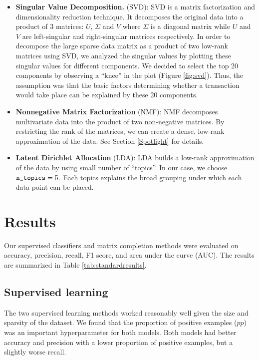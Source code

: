 \documentclass{article} %
\begin{document}
\begin{itemize}

    \item \textbf{Singular Value Decomposition.} (SVD): SVD is a matrix factorization and dimensionality reduction technique. It decomposes the original data into a product of 3 matrices: $U$, $\Sigma$ and $V$ where $\Sigma$ is a diagonal matrix while $U$ and $V$ are left-singular and right-singular matrices respectively. In order to decompose the large sparse data matrix as a product of two low-rank matrices using SVD, we analyzed the singular values by plotting these singular values for different components. We decided to select the top 20 components by observing a “knee” in the plot (Figure \ref{fig:svd}). Thus, the assumption was that the basic factors determining whether a transaction would take place can be explained by these 20 components.

    \item \textbf{Nonnegative Matrix Factorization} (NMF): NMF decomposes multivariate data into the product of two non-negative matrices. By restricting the rank of the matrices, we can create a dense, low-rank approximation of the data. See Section \ref{Spotlight} for details.

    \item \textbf{Latent Dirichlet Allocation} (LDA): LDA builds a low-rank approximation of the data by using small number of ``topics''. In our case, we choose $\texttt{\detokenize{n_topics}}=5$. Each topics explains the broad grouping under which each data point can  be placed.

\end{itemize}

\section{Results}

Our supervised classifiers and matrix completion methods were evaluated on accuracy, precision, recall, F1 score, and area under the curve (AUC). The results are summarized in Table \ref{tab:standardresults}.

\subsection{Supervised learning}

The two supervised learning methods worked reasonably well given the size and sparsity of the dataset. We found that the proportion of positive examples ($pp$) was an important hyperparameter for both models. Both models had better accuracy and precision with a lower proportion of positive examples, but a slightly worse recall.
\end{document}
